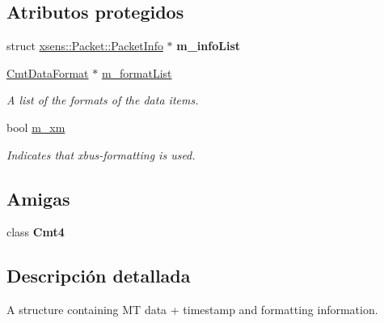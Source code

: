 \subsection*{\-Atributos protegidos}
\begin{DoxyCompactItemize}
\item 
\hypertarget{classxsens_1_1Packet_a2bcae8ca41d490246c288d624570dfeb}{struct \hyperlink{structxsens_1_1Packet_1_1PacketInfo}{xsens\-::\-Packet\-::\-Packet\-Info} $\ast$ {\bfseries m\-\_\-info\-List}}\label{classxsens_1_1Packet_a2bcae8ca41d490246c288d624570dfeb}

\item 
\hypertarget{classxsens_1_1Packet_a4567368d064b3d67414f1fe9499847d8}{\hyperlink{structCmtDataFormat}{\-Cmt\-Data\-Format} $\ast$ \hyperlink{classxsens_1_1Packet_a4567368d064b3d67414f1fe9499847d8}{m\-\_\-format\-List}}\label{classxsens_1_1Packet_a4567368d064b3d67414f1fe9499847d8}

\begin{DoxyCompactList}\small\item\em \-A list of the formats of the data items. \end{DoxyCompactList}\item 
\hypertarget{classxsens_1_1Packet_ac0fb6d74788dd2630a356776acf7da52}{bool \hyperlink{classxsens_1_1Packet_ac0fb6d74788dd2630a356776acf7da52}{m\-\_\-xm}}\label{classxsens_1_1Packet_ac0fb6d74788dd2630a356776acf7da52}

\begin{DoxyCompactList}\small\item\em \-Indicates that xbus-\/formatting is used. \end{DoxyCompactList}\end{DoxyCompactItemize}
\subsection*{\-Amigas}
\begin{DoxyCompactItemize}
\item 
\hypertarget{classxsens_1_1Packet_a3cc152acee747525138d34ffc3462de4}{class {\bfseries \-Cmt4}}\label{classxsens_1_1Packet_a3cc152acee747525138d34ffc3462de4}

\end{DoxyCompactItemize}


\subsection{\-Descripción detallada}
\-A structure containing \-M\-T data + timestamp and formatting information. 

